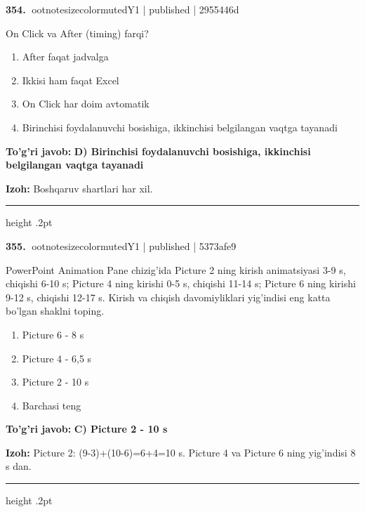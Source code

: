 \documentclass[10pt,a4paper]{article}
\begin{document}
\textbf{\color{ink}354.} {ootnotesizecolor{muted}Y1 | published | 2955446d}
\par
On Click va After (timing) farqi?
\begin{enumerate}[label=\Alph*),leftmargin=9mm]
\item After faqat jadvalga
\item Ikkisi ham faqat Excel
\item On Click har doim avtomatik
\item Birinchisi foydalanuvchi bosishiga, ikkinchisi belgilangan vaqtga tayanadi
\end{enumerate}
\begin{tcolorbox}[enhanced,breakable,colback=teal!4,colframe=teal!55!black,boxrule=0.45pt,arc=1.2mm,left=2.8mm,right=2.8mm,top=2mm,bottom=2mm]
\textbf{\color{teal}To'g'ri javob:} \textbf{D) Birinchisi foydalanuvchi bosishiga, ikkinchisi belgilangan vaqtga tayanadi}
\par\smallskip
\textbf{Izoh:} Boshqaruv shartlari har xil.
\end{tcolorbox}
\vspace{2mm}\hrule height .2pt\vspace{2mm}

\textbf{\color{ink}355.} {ootnotesizecolor{muted}Y1 | published | 5373afe9}
\par
PowerPoint Animation Pane chizig'ida Picture 2 ning kirish animatsiyasi 3-9 s, chiqishi 6-10 s; Picture 4 ning kirishi 0-5 s, chiqishi 11-14 s; Picture 6 ning kirishi 9-12 s, chiqishi 12-17 s. Kirish va chiqish davomiyliklari yig'indisi eng katta bo'lgan shaklni toping.
\begin{enumerate}[label=\Alph*),leftmargin=9mm]
\item Picture 6 - 8 s
\item Picture 4 - 6,5 s
\item Picture 2 - 10 s
\item Barchasi teng
\end{enumerate}
\begin{tcolorbox}[enhanced,breakable,colback=teal!4,colframe=teal!55!black,boxrule=0.45pt,arc=1.2mm,left=2.8mm,right=2.8mm,top=2mm,bottom=2mm]
\textbf{\color{teal}To'g'ri javob:} \textbf{C) Picture 2 - 10 s}
\par\smallskip
\textbf{Izoh:} Picture 2: (9-3)+(10-6)=6+4=10 s. Picture 4 va Picture 6 ning yig'indisi 8 s dan.
\end{tcolorbox}
\vspace{2mm}\hrule height .2pt\vspace{2mm}
\end{document}
